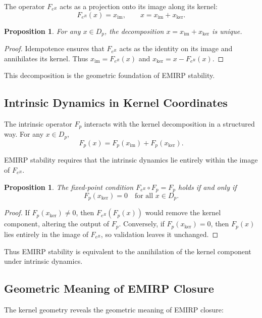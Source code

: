 \documentclass[11pt]{article}
\theoremstyle{definition}
\theoremstyle{plain}
\newtheorem{proposition}[definition]{Proposition}
\theoremstyle{remark}
\begin{document}
The operator $F_{e^R}$ acts as a projection onto its image along its
kernel:
\[
F_{e^R}(x) = x_{\mathrm{im}},
\qquad
x = x_{\mathrm{im}} + x_{\ker}.
\]

\begin{proposition}
For any $x \in D_p$, the decomposition
$x = x_{\mathrm{im}} + x_{\ker}$ is unique.
\end{proposition}

\begin{proof}
Idempotence ensures that $F_{e^R}$ acts as the identity on its image and
annihilates its kernel. Thus $x_{\mathrm{im}} = F_{e^R}(x)$ and
$x_{\ker} = x - F_{e^R}(x)$.
\end{proof}

This decomposition is the geometric foundation of EMIRP stability.

\subsection{Intrinsic Dynamics in Kernel Coordinates}

The intrinsic operator $F_p$ interacts with the kernel decomposition in
a structured way. For any $x \in D_p$,
\[
F_p(x) = F_p(x_{\mathrm{im}}) + F_p(x_{\ker}).
\]

EMIRP stability requires that the intrinsic dynamics lie entirely within
the image of $F_{e^R}$.

\begin{proposition}
The fixed-point condition $F_{e^R} \circ F_p = F_p$ holds if and only if
\[
F_p(x_{\ker}) = 0
\quad \text{for all } x \in D_p.
\]
\end{proposition}

\begin{proof}
If $F_p(x_{\ker}) \neq 0$, then $F_{e^R}(F_p(x))$ would remove the
kernel component, altering the output of $F_p$. Conversely, if
$F_p(x_{\ker}) = 0$, then $F_p(x)$ lies entirely in the image of
$F_{e^R}$, so validation leaves it unchanged.
\end{proof}

Thus EMIRP stability is equivalent to the annihilation of the kernel
component under intrinsic dynamics.

\subsection{Geometric Meaning of EMIRP Closure}

The kernel geometry reveals the geometric meaning of EMIRP closure:
\end{document}
